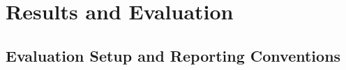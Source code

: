 
\section{Results and Evaluation}
\label{sec:results}
%

\subsection{Evaluation Setup and Reporting Conventions}
\label{sec:results-setup}


